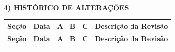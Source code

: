 
\vspace{5pt}

{\sffamily\bfseries 4) HIST\'ORICO DE ALTERA\c{C}\~OES}

\vspace{2pt}
\begin{longtable}{|>{\footnotesize\centering\arraybackslash}p{}|>{\footnotesize\centering\arraybackslash}p{}|>{\footnotesize\centering\arraybackslash}p{}|>{\footnotesize\centering\arraybackslash}p{}|>{\footnotesize\centering\arraybackslash}p{}|>{\footnotesize\raggedright\arraybackslash}p{}|}
\hline
\textbf{Se\c{c}\~ao} & \textbf{Data} & \textbf{A} & \textbf{B} & \textbf{C} & \textbf{Descri\c{c}\~ao da Revis\~ao} \\
\hline
\endfirsthead
\hline
\textbf{Se\c{c}\~ao} & \textbf{Data} & \textbf{A} & \textbf{B} & \textbf{C} & \textbf{Descri\c{c}\~ao da Revis\~ao} \\
\hline
\endhead
\hline
\endfoot


\end{longtable}

